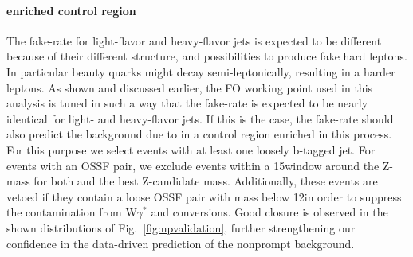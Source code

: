 \paragraph{\texorpdfstring{\ttbar}{ttbar} enriched control region}
The fake-rate for light-flavor and heavy-flavor jets is expected to be different because of their different structure, and possibilities to produce fake hard leptons. In particular beauty quarks might decay semi-leptonically, resulting in a harder leptons. As shown and discussed earlier, the FO working point used in this analysis is tuned in such a way that the fake-rate is expected to be nearly identical for light- and heavy-flavor jets. If this is the case, the fake-rate should also predict the background due to \ttbar  in a control region enriched in this process.
For this purpose we select events with at least one loosely b-tagged jet. 
For events with an OSSF pair, we exclude events within a 15\GeV window around the Z-mass for both \mlll  and the best Z-candidate mass. Additionally, these events are vetoed if they contain a loose OSSF pair with mass below 12\GeV in order to suppress the contamination from W$\gamma^{*}$ and conversions. Good closure is observed in the shown distributions of Fig.~\ref{fig:npvalidation}, further strengthening our confidence in the data-driven prediction of the nonprompt background.

